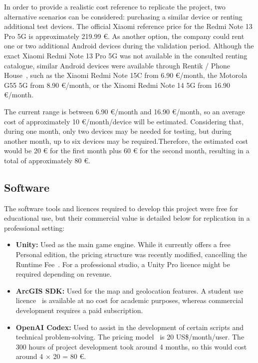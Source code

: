 In order to provide a realistic cost reference to replicate the project, two alternative scenarios can be considered: purchasing a similar device or renting additional test devices.
The official Xiaomi reference price for the Redmi Note 13 Pro 5G is approximately 219.99 €. As another option, the company could rent one or two additional Android devices during the validation period. Although the exact Xiaomi Redmi Note 13 Pro 5G was not available in the consulted renting catalogue, similar Android devices were available through Rentik / Phone House~\cite{rentik}, such as the Xiaomi Redmi Note 15C from 6.90 €/month, the Motorola G55 5G from 8.90 €/month, or the Xiaomi Redmi Note 14 5G from 16.90 €/month.

The current range is between 6.90 €/month and 16.90 €/month, so an average cost of approximately 10 €/month/device will be estimated. Considering that, during one month, only two devices may be needed for testing, but during another month, up to six devices may be required.Therefore, the estimated cost would be 20 € for the first month plus 60 € for the second month, resulting in a total of approximately 80 €.


\subsection{Software}
The software tools and licences required to develop this project were free for educational use, but their commercial value is detailed below for replication in a professional setting:
\begin{itemize}
    \item \textbf{Unity:} Used as the main game engine. While it currently offers a free Personal edition, the pricing structure was recently modified, cancelling the Runtime Fee~\cite{unity_pricing}. For a professional studio, a Unity Pro licence might be required depending on revenue.
    \item \textbf{ArcGIS SDK:} Used for the map and geolocation features. A student use licence~\cite{arcgis_license} is available at no cost for academic purposes, whereas commercial development requires a paid subscription.
    \item \textbf{OpenAI Codex:} Used to assist in the development of certain scripts and technical problem-solving. The pricing model~\cite{codex_pricing} is 20 US\$/month/user. The 300 hours of project development took around 4 months, so this would cost around 4 × 20 = 80 €.
\end{itemize}

